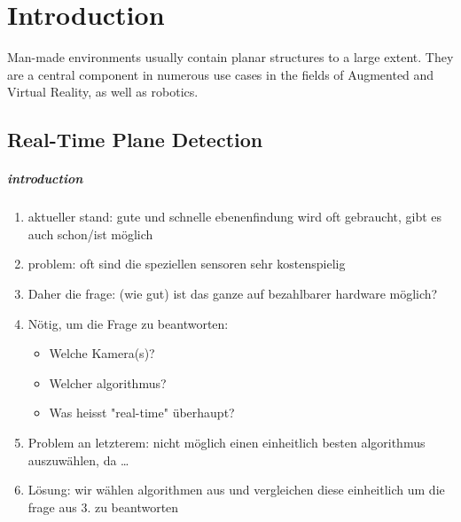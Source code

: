 \documentclass[main.tex]{subfiles}
\begin{document}
\chapter{Introduction}\label{chap:Introduction}

Man-made environments usually contain planar structures to a large extent.
They are a central component in numerous use cases in the fields of Augmented and Virtual Reality, as well as robotics.

\section{Real-Time Plane Detection}

\paragraph*{introduction}
\begin{enumerate}
    \item aktueller stand: gute und schnelle ebenenfindung wird oft gebraucht, gibt es auch schon/ist möglich
    \item problem: oft sind die speziellen sensoren sehr kostenspielig
    \item Daher die frage: (wie gut) ist das ganze auf bezahlbarer hardware möglich?
    \item Nötig, um die Frage zu beantworten: 
        \begin{itemize}
            \item Welche Kamera(s)? %
            \item Welcher algorithmus?
            \item Was heisst "real-time" überhaupt?
        \end{itemize} 
        \item Problem an letzterem: nicht möglich einen einheitlich besten algorithmus auszuwählen, da \dots{}  %
    \item Lösung: wir wählen algorithmen aus und vergleichen diese einheitlich um die frage aus 3. zu beantworten
\end{enumerate}
\end{document}
